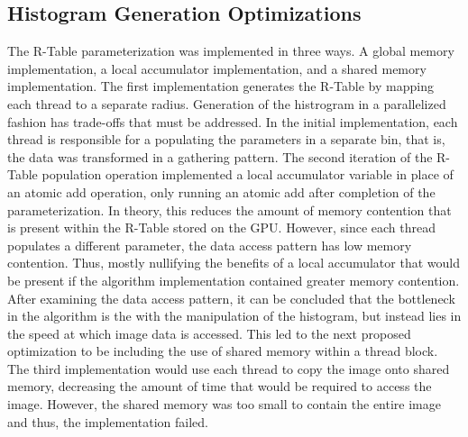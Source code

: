 \documentclass[conference]{IEEEtran}
\begin{document}
\subsection*{Histogram Generation Optimizations}
The R-Table parameterization was implemented in three ways. A global memory implementation, a local accumulator implementation, and a shared memory implementation.
The first implementation generates the R-Table by mapping each thread to a separate radius.
Generation of the histrogram in a parallelized fashion has trade-offs that must be addressed. 
In the initial implementation, each thread is responsible for a populating the parameters in a separate bin, that is, the data was transformed in a gathering pattern. 
The second iteration of the R-Table population operation implemented a local accumulator variable in place of an atomic add operation, only running an atomic add after completion of the parameterization.
In theory, this reduces the amount of memory contention that is present within the R-Table stored on the GPU\@.
However, since each thread populates a different parameter, the data access pattern has low memory contention.
Thus, mostly nullifying the benefits of a local accumulator that would be present if the algorithm implementation contained greater memory contention.
After examining the data access pattern, it can be concluded that the bottleneck in the algorithm is the with the manipulation of the histogram, but instead lies in the speed at which image data is accessed.
This led to the next proposed optimization to be including the use of shared memory within a thread block.
The third implementation would use each thread to copy the image onto shared memory, decreasing the amount of time that would be required to access the image.
However, the shared memory was too small to contain the entire image and thus, the implementation failed. 
\end{document}
